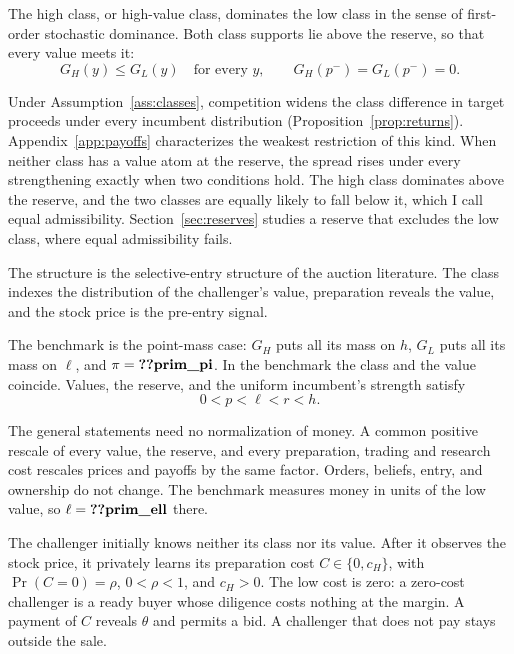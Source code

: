 \begin{assumption}\label{ass:classes}
The high class, or high-value class, dominates the low class in the sense of first-order stochastic
dominance. Both class supports lie above the reserve, so that every value meets it:
\[
G_H(y)\le G_L(y)\quad\text{for every }y,\qquad G_H(p^-)=G_L(p^-)=0.
\]
\end{assumption}

Under Assumption~\ref{ass:classes}, competition widens the class difference in target proceeds under every
incumbent distribution (Proposition~\ref{prop:returns}). Appendix~\ref{app:payoffs} characterizes the weakest
restriction of this kind. When neither class has a value atom at the reserve, the spread rises under every
strengthening exactly when two conditions hold. The high class dominates above the reserve, and the two classes
are equally likely to fall below it, which I call equal admissibility. Section~\ref{sec:reserves} studies a
reserve that excludes the low class, where equal admissibility fails.

The structure is the selective-entry structure of the auction literature. The class indexes the distribution of
the challenger's value, preparation reveals the value, and the stock price is the pre-entry signal.

The benchmark is the point-mass case: \(G_H\) puts all its mass on \(h\), \(G_L\) puts all its mass on
\(\ell\), and \(\pi=\reg{prim_pi}\). In the benchmark the class and the value coincide. Values, the reserve, and the
uniform incumbent's strength satisfy
\begin{equation}\label{eq:order}
0<p<\ell<r<h.
\end{equation}

The general statements need no normalization of money. A common positive rescale of every value, the reserve,
and every preparation, trading and research cost rescales prices and payoffs by the same factor. Orders,
beliefs, entry, and ownership do not change. The benchmark measures money in units of the low value, so
\(\ell=\reg{prim_ell}\) there.

The challenger initially knows neither its class nor its value. After it observes the stock price, it
privately learns its preparation cost \(C\in\{0,c_H\}\), with \(\Pr(C=0)=\rho\), \(0<\rho<1\), and
\(c_H>0\). The low cost is zero: a zero-cost challenger is a ready buyer whose diligence costs nothing at the
margin. A payment of \(C\) reveals \(\theta\) and permits a bid. A challenger that does not pay stays outside
the sale.

